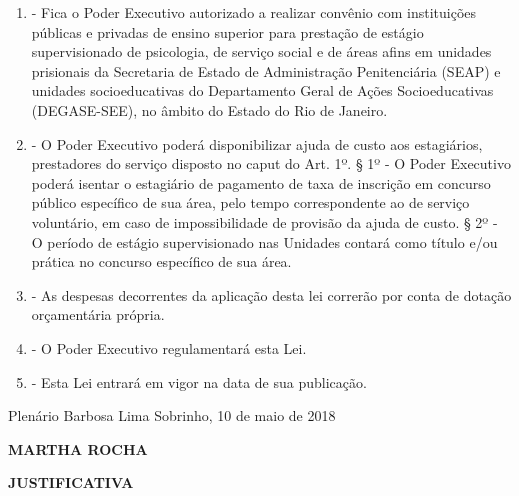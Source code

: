 \documentclass[10pt]{article}
\begin{document}
\begin{enumerate}[label=Art. \arabic*\textdegree]

\item - Fica o Poder Executivo autorizado a realizar convênio com instituições públicas e privadas de ensino superior para prestação de estágio supervisionado de psicologia, de serviço social e de áreas afins em unidades prisionais da Secretaria de Estado de Administração Penitenciária (SEAP) e unidades socioeducativas do Departamento Geral de Ações Socioeducativas (DEGASE-SEE), no âmbito do Estado do Rio de Janeiro.

\item - O Poder Executivo poderá disponibilizar ajuda de custo aos estagiários, prestadores do serviço disposto no caput do Art. 1º.
§ 1º - O Poder Executivo poderá isentar o estagiário de pagamento de taxa de inscrição em concurso público específico de sua área, pelo tempo correspondente ao de serviço voluntário, em caso de impossibilidade de provisão da ajuda de custo.
§ 2º - O período de estágio supervisionado nas Unidades contará como título e/ou prática no concurso específico de sua área. 

\item - As despesas decorrentes da aplicação desta lei correrão por conta de dotação orçamentária própria.

\item - O Poder Executivo regulamentará esta Lei.

\item - Esta Lei entrará em vigor na data de sua publicação.




















\end{enumerate}




\begin{center}
  Plenário Barbosa Lima Sobrinho, 10 de maio de 2018

   \bigskip

  \textbf{ MARTHA ROCHA}

  \bigskip

  \textbf{JUSTIFICATIVA}
  \bigskip

\end{center}
\end{document}
